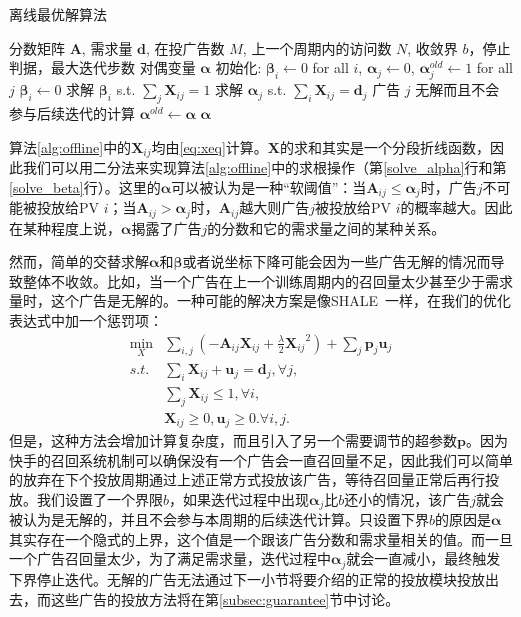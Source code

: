 \begin{algorithm}[htb]
	\caption{离线最优解算法} 
	\label{alg:offline}
	\begin{algorithmic}[1]
		\REQUIRE 分数矩阵 $\bm{A}$, 需求量 $\bm{d}$, 在投广告数 $M$, 上一个周期内的访问数 $N$, 收敛界 $b$，停止判据，最大迭代步数
		\ENSURE 对偶变量 $\bm{\alpha}$ 
		\STATE 初始化: $\bm{\beta}_i \leftarrow 0$ for all $i$, $\bm{\alpha}_j \leftarrow 0$, $\bm{\alpha}^{old}_j \leftarrow 1$ for all $j$
		\STATE $\bm{\beta}_i \leftarrow 0$
		\ELSE
		\STATE 求解 $\bm{\beta}_i$ s.t. $\sum_j \bm{X}_{ij} = 1$ \label{solve_beta}
		\ENDIF
		\ENDFOR
		\STATE 求解 $\bm{\alpha}_j$ s.t. $\sum_i \bm{X}_{ij} = \bm{d}_j$ \label{solve_alpha}
		\STATE 广告 $j$ 无解而且不会参与后续迭代的计算 \label{bound}
		\ENDIF
		\ENDFOR
		\STATE $\bm{\alpha}^{old} \leftarrow \bm{\alpha}$
		\ENDWHILE
		\RETURN $\bm{\alpha}$ 
	\end{algorithmic}
\end{algorithm}

算法\ref{alg:offline}中的$\bm{X}_{ij}$均由\eqref{eq:xeq}计算。$\bm{X}$的求和其实是一个分段折线函数，因此我们可以用二分法来实现算法\ref{alg:offline}中的求根操作（第\ref{solve_alpha}行和第\ref{solve_beta}行）。这里的$\bm{\alpha}$可以被认为是一种“软阈值”：当$\bm{A}_{ij} \le \bm{\alpha}_j$时，广告$j$不可能被投放给PV $i$；当$\bm{A}_{ij} > \bm{\alpha}_j$时，$\bm{A}_{ij}$越大则广告$j$被投放给PV $i$的概率越大。因此在某种程度上说，$\bm{\alpha}$揭露了广告$j$的分数和它的需求量之间的某种关系。

然而，简单的交替求解$\bm{\alpha}$和$\bm{\beta}$或者说坐标下降可能会因为一些广告无解的情况而导致整体不收敛。比如，当一个广告在上一个训练周期内的召回量太少甚至少于需求量时，这个广告是无解的。一种可能的解决方案是像SHALE~\cite{bharadwaj2012shale}一样，在我们的优化表达式中加一个惩罚项：
\begin{equation}
\begin{aligned}
\min_X &\sum_{i,j}  (-\bm{A}_{ij}\bm{X}_{ij} + \frac{\lambda}{2}{\bm{X}_{ij}}^2) + \sum_j \bm{p}_j\bm{u}_j  \\
s.t. & \sum_i \bm{X}_{ij} + \bm{u}_j = \bm{d}_j, \forall j, \\
& \sum_j \bm{X}_{ij} \le 1, \forall i, \\
& \bm{X}_{ij} \ge 0, \bm{u}_j \ge 0. \forall i, j. 
\end{aligned}
\end{equation}
但是，这种方法会增加计算复杂度，而且引入了另一个需要调节的超参数$\bm{p}$。因为快手的召回系统机制可以确保没有一个广告会一直召回量不足，因此我们可以简单的放弃在下个投放周期通过上述正常方式投放该广告，等待召回量正常后再行投放。我们设置了一个界限$b$，如果迭代过程中出现$\bm{\alpha}_j$比$b$还小的情况，该广告$j$就会被认为是无解的，并且不会参与本周期的后续迭代计算。只设置下界$b$的原因是$\bm{\alpha}$其实存在一个隐式的上界，这个值是一个跟该广告分数和需求量相关的值。而一旦一个广告召回量太少，为了满足需求量，迭代过程中$\bm{\alpha}_j$就会一直减小，最终触发下界停止迭代。无解的广告无法通过下一小节将要介绍的正常的投放模块投放出去，而这些广告的投放方法将在第\ref{subsec:guarantee}节中讨论。

